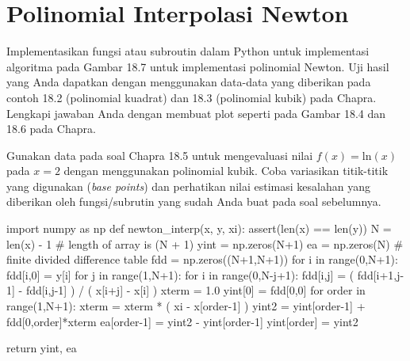 \section{Polinomial Interpolasi Newton}

\begin{soal}
Implementasikan fungsi atau subroutin dalam Python untuk implementasi algoritma
pada Gambar 18.7 untuk implementasi polinomial Newton.
Uji hasil yang Anda dapatkan dengan menggunakan data-data yang diberikan pada contoh
18.2 (polinomial kuadrat) dan 18.3 (polinomial kubik) pada Chapra.
Lengkapi jawaban Anda dengan membuat plot seperti pada Gambar 18.4 dan 18.6 pada Chapra.
\end{soal}

\begin{soal}
Gunakan data pada soal Chapra 18.5 untuk mengevaluasi nilai $f(x) = \mathrm{ln}(x)$
pada $x = 2$ dengan menggunakan polinomial kubik. Coba variasikan titik-titik
yang digunakan (\textit{base points}) dan perhatikan nilai estimasi
kesalahan yang diberikan oleh
fungsi/subrutin yang sudah Anda buat pada soal sebelumnya.
\end{soal}

\begin{pythoncode}
import numpy as np
def newton_interp(x, y, xi):
    assert(len(x) == len(y))
    N = len(x) - 1  # length of array is (N + 1)
    yint = np.zeros(N+1)
    ea = np.zeros(N)
    # finite divided difference table
    fdd = np.zeros((N+1,N+1))
    for i in range(0,N+1):
        fdd[i,0] = y[i]
    for j in range(1,N+1):
        for i in range(0,N-j+1):
            fdd[i,j] = ( fdd[i+1,j-1] - fdd[i,j-1] ) / ( x[i+j] - x[i] )
    xterm = 1.0
    yint[0] = fdd[0,0]  
    for order in range(1,N+1):
        xterm = xterm * ( xi - x[order-1] )
        yint2 = yint[order-1] + fdd[0,order]*xterm
        ea[order-1] = yint2 - yint[order-1]
        yint[order] = yint2 
      
    return yint, ea  
\end{pythoncode}